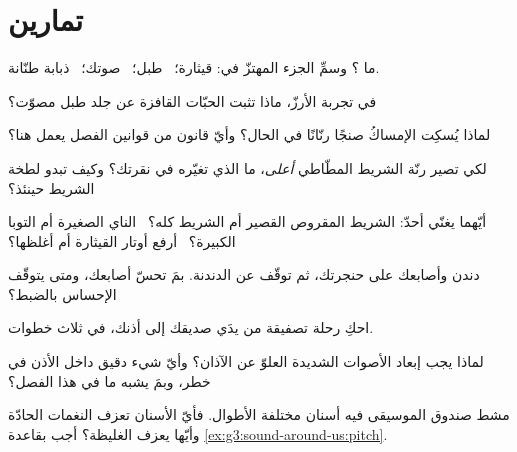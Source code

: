 \section{تمارين}

\begin{exercise}[$\star$]\label{exo:g3:sound-around-us:1}
ما ؟ وسمِّ الجزء المهتزّ في: قيثارة؛ \ طبل؛
\ صوتك؛ \ ذبابة طنّانة.
\end{exercise}

\begin{exercise}[$\star$]\label{exo:g3:sound-around-us:2}
في تجربة الأرزّ، ماذا تثبت الحبّات القافزة عن جلد طبل مصوّت؟
\end{exercise}

\begin{exercise}[$\star$]\label{exo:g3:sound-around-us:3}
لماذا يُسكِت الإمساكُ صنجًا رنّانًا في الحال؟ وأيّ قانون من
قوانين الفصل يعمل هنا؟
\end{exercise}

\begin{exercise}[$\star$]\label{exo:g3:sound-around-us:4}
لكي تصير رنّة الشريط المطّاطي \emph{أعلى}، ما الذي تغيّره في
نقرتك؟ وكيف تبدو لطخة الشريط حينئذ؟
\end{exercise}

\begin{exercise}[$\star$]\label{exo:g3:sound-around-us:5}
أيّهما يغنّي أحدّ: الشريط المقروص القصير أم الشريط كله؟ \ الناي
الصغيرة أم التوبا الكبيرة؟ \ أرفع أوتار القيثارة أم أغلظها؟
\end{exercise}

\begin{exercise}[$\star$]\label{exo:g3:sound-around-us:6}
دندن وأصابعك على حنجرتك، ثم توقّف عن الدندنة. بمَ تحسّ أصابعك،
ومتى يتوقّف الإحساس بالضبط؟
\end{exercise}

\begin{exercise}[$\star$]\label{exo:g3:sound-around-us:7}
احكِ رحلة تصفيقة من يدَي صديقك إلى أذنك، في ثلاث خطوات.
\end{exercise}

\begin{exercise}[$\star$]\label{exo:g3:sound-around-us:8}
لماذا يجب إبعاد الأصوات الشديدة العلوّ عن الآذان؟ وأيّ شيء دقيق
داخل الأذن في خطر، وبمَ يشبه ما في هذا الفصل؟
\end{exercise}

\begin{exercise}[$\star$]\label{exo:g3:sound-around-us:9}
مشط صندوق الموسيقى فيه أسنان مختلفة الأطوال. فأيّ الأسنان تعزف
النغمات الحادّة وأيّها يعزف الغليظة؟ أجب بقاعدة
\cref{ex:g3:sound-around-us:pitch}.
\end{exercise}

